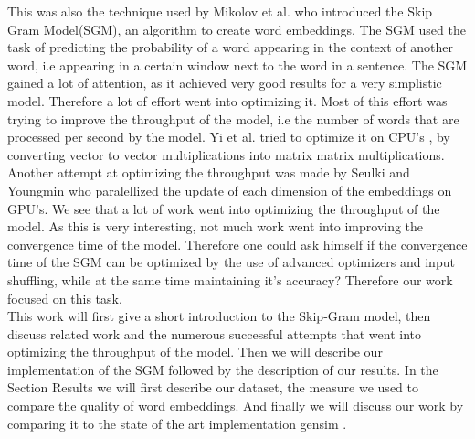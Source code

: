 This was also the technique used by Mikolov et al. \cite{mikolov} who  introduced the Skip Gram Model(SGM), an algorithm to create word embeddings. The SGM used the task of predicting the probability of a word appearing in the context of another word, i.e appearing in a certain window next to the word in a sentence. The SGM gained a lot of attention, as it achieved very good results for a very simplistic model. Therefore a lot of effort went into optimizing it. Most of this effort was trying to improve the throughput of the model, i.e the number of words that are processed per second by the model.  Yi et al. tried to optimize it on CPU's \cite{intel}, by converting vector to vector multiplications into matrix matrix multiplications. Another attempt at optimizing the throughput was made by Seulki and Youngmin \cite{gpu} who paralellized the update of each dimension of the embeddings on GPU's. We see that a lot of work went into optimizing the throughput of the model. As this is very interesting, not much work went into improving the convergence time of the model. Therefore one could ask himself if  the convergence time of the SGM can be optimized by the use of advanced optimizers and input shuffling, while at the same time maintaining it's accuracy?  Therefore our work focused on this task.\\

This work will first give a short introduction to the Skip-Gram model, then discuss related work and the numerous successful attempts that went into optimizing the throughput of the model. Then we will describe our implementation of the SGM followed by the description of our results. In the Section Results we will first describe our dataset, the measure we used to compare the quality of word embeddings. And finally we will discuss our work by comparing it to the state of the art implementation gensim \cite{gensim}. 

  














